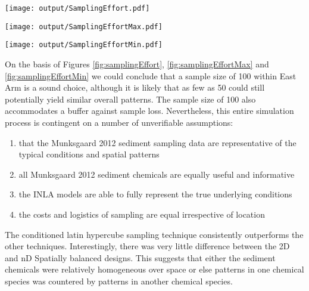 \documentclass[a4paper]{article}
\let\origfigure=\figure
\let\endorigfigure=\endfigure
\renewenvironment{figure}[1][]{%
   \origfigure[H]
}{%
   \endorigfigure
}
\begin{document}
\begin{figure}
\centering\scriptsize
\texttt{[image: output/SamplingEffort.pdf]}
\caption{Comparison of the mean Error conditional on sample size and
sampling method for the East Arm\label{fig:samplingEffort}}
\end{figure}

\begin{figure}
\centering\scriptsize
\texttt{[image: output/SamplingEffortMax.pdf]}
\caption{Comparison of the maximum Error conditional on sample size and
sampling method for the East Arm\label{fig:samplingEffortMax}}
\end{figure}

\begin{figure}
\centering\scriptsize
\texttt{[image: output/SamplingEffortMin.pdf]}
\caption{Comparison of the minimum Error conditional on sample size and
sampling method for the East Arm\label{fig:samplingEffortMin}}
\end{figure}

On the basis of Figures \ref{fig:samplingEffort},
\ref{fig:samplingEffortMax} and \ref{fig:samplingEffortMin} we could
conclude that a sample size of 100 within East Arm is a sound choice,
although it is likely that as few as 50 could still potentially yield
similar overall patterns. The sample size of 100 also accommodates a
buffer against sample loss. Nevertheless, this entire simulation process
is contingent on a number of unverifiable assumptions:

\begin{enumerate}
\def\labelenumi{\arabic{enumi}.}
\tightlist
\item
  that the Munksgaard 2012 sediment sampling data are representative of
  the typical conditions and spatial patterns
\item
  all Munksgaard 2012 sediment chemicals are equally useful and
  informative
\item
  the INLA models are able to fully represent the true underlying
  conditions
\item
  the costs and logistics of sampling are equal irrespective of location
\end{enumerate}

The conditioned latin hypercube sampling technique consistently
outperforms the other techniques. Interestingly, there was very little
difference between the 2D and nD Spatially balanced designs. This
suggests that either the sediment chemicals were relatively homogeneous
over space or else patterns in one chemical species was countered by
patterns in another chemical species.
\end{document}
